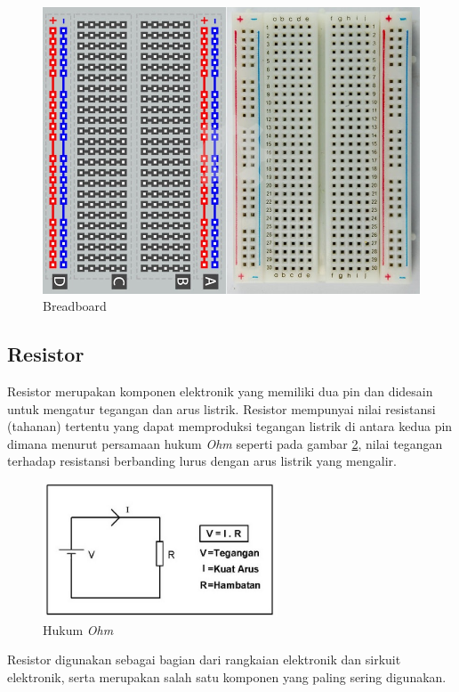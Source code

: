 \begin{figure}[H]
	\centerline {
		\includegraphics[width=\linewidth]{bab3/img/breadboard.jpg}
	}
	\caption{Breadboard}
	\label{figure:breadboard_scheme}
\end{figure}

\subsection{Resistor}
\tab Resistor merupakan komponen elektronik yang memiliki dua pin dan didesain untuk mengatur tegangan dan arus listrik. Resistor mempunyai nilai resistansi (tahanan) tertentu yang dapat memproduksi tegangan listrik di antara kedua pin dimana menurut persamaan hukum \textit{Ohm} seperti pada gambar \ref{figure:hukum-ohm}, nilai tegangan terhadap resistansi berbanding lurus dengan arus listrik yang mengalir.

\begin{figure}[H]
	\centerline {
		\includegraphics[height=4cm]{bab3/img/hukum-ohm.jpg}
	}
	\caption{Hukum \textit{Ohm}}
	\label{figure:hukum-ohm}
\end{figure}

Resistor digunakan sebagai bagian dari rangkaian elektronik dan sirkuit elektronik, serta merupakan salah satu komponen yang paling sering digunakan. 

